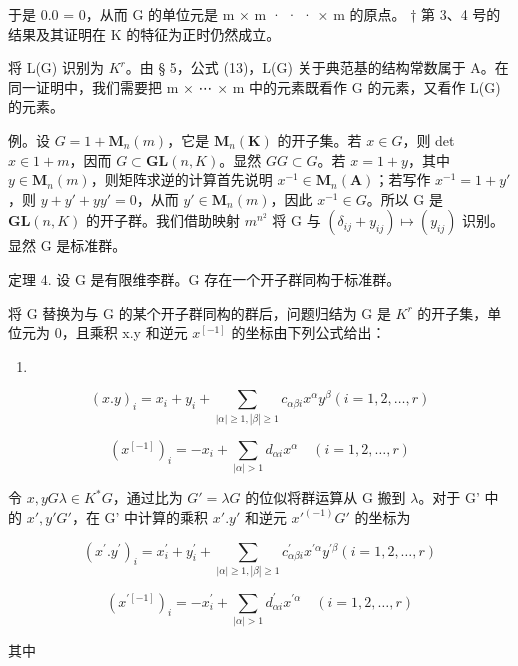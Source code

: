 于是 0.0 = 0，从而 G 的单位元是 m × m · · · × m 的原点。
† 第 3、4 号的结果及其证明在 K 的特征为正时仍然成立。

将 L(G) 识别为 \(K^r\)。由 § 5，公式 (13)，L(G) 关于典范基的结构常数属于 A。在同一证明中，我们需要把 m × ⋯ × m 中的元素既看作 G 的元素，又看作 L(G) 的元素。

例。设 \(G = 1 + \mathbf{M}_{n}(m)\)，它是 \(\mathbf{M}_{n}(\mathbf{K})\) 的开子集。若 \(x \in G\)，则 det \(x \in 1 + m\)，因而 \(G \subset \mathbf{GL}(n, K)\)。显然 \(GG \subset G\)。若 \(x = 1 + y\)，其中 \(y \in \mathbf{M}_{n}(m)\)，则矩阵求逆的计算首先说明 \(x^{-1} \in \mathbf{M}_{n}(\mathbf{A})\)；若写作 \(x^{-1} = 1 + y'\)，则 \(y + y' + yy' = 0\)，从而 \(y' \in \mathbf{M}_{n}(m)\)，因此 \(x^{-1} \in G\)。所以 G 是 \(\mathbf{GL}(n, K)\) 的开子群。我们借助映射 \(m^{n^2}\) 将 G 与 \((\delta_{ij} + y_{ij}) \mapsto (y_{ij})\) 识别。显然 G 是标准群。

定理 4. 设 G 是有限维李群。G 存在一个开子群同构于标准群。

将 G 替换为与 G 的某个开子群同构的群后，问题归结为 G 是 \(K^{r}\) 的开子集，单位元为 0，且乘积 x.y 和逆元 \(x^{[-1]}\) 的坐标由下列公式给出：

\begin{enumerate}
\def\labelenumi{(\arabic{enumi})}
\setcounter{enumi}{2}
\tightlist
\item
\end{enumerate}

\[
(x. y) _ {i} = x _ {i} + y _ {i} + \sum_ {| \alpha | \geqslant 1, | \beta | \geqslant 1} c _ {\alpha \beta i} x ^ {\alpha} y ^ {\beta} (i = 1, 2, \dots , r)\tag{3}
\]

\[
(x ^ {[ - 1 ]}) _ {i} = - x _ {i} + \sum_ {| \alpha | > 1} d _ {\alpha i} x ^ {\alpha} \quad (i = 1, 2, \dots , r)\tag{4}
\]

令 \(x, y\)\(G\)\(\lambda \in K^*\)\(G\)，通过比为 \(G' = \lambda G\) 的位似将群运算从 G 搬到 \(\lambda\)。对于 G' 中的 \(x', y'\)\(G'\)，在 G' 中计算的乘积 \(x'.y'\) 和逆元 \(x'^{(-1)}\)\(G'\) 的坐标为

\[
(x ^ {\prime}. y ^ {\prime}) _ {i} = x _ {i} ^ {\prime} + y _ {i} ^ {\prime} + \sum_ {| \alpha | \geqslant 1, | \beta | \geqslant 1} c _ {\alpha \beta i} ^ {\prime} x ^ {\prime \alpha} y ^ {\prime \beta} (i = 1, 2, \dots , r)
\]

\[
(x ^ {\prime [ - 1 ]}) _ {i} = - x _ {i} ^ {\prime} + \sum_ {| \alpha | > 1} d _ {\alpha i} ^ {\prime} x ^ {\prime \alpha} \quad (i = 1, 2, \dots , r)
\]

其中

